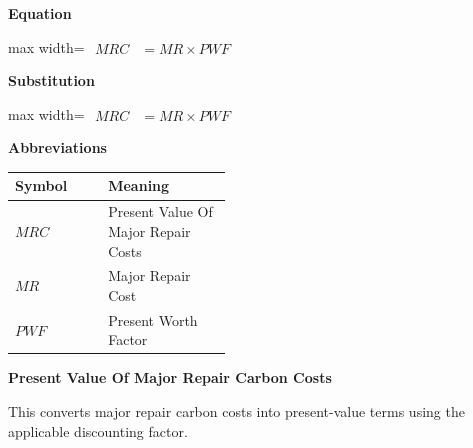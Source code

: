 \documentclass{article}
\begin{document}
\vspace{0.4em}
\textbf{Equation}\par\vspace{-0.35em}
\begin{center}
\begin{adjustbox}{max width=\linewidth}
$\displaystyle\begin{aligned}
MRC &= MR \times PWF
\end{aligned}$
\end{adjustbox}
\end{center}
\vspace{0.4em}
\textbf{Substitution}\par\vspace{-0.35em}
\begin{center}
\begin{adjustbox}{max width=\linewidth}
$\displaystyle\begin{aligned}
MRC &= MR \times PWF
\end{aligned}$
\end{adjustbox}
\end{center}
\vspace{0.4em}
\textbf{Abbreviations}\par\vspace{-0.35em}
\begin{tabularx}{\linewidth}{>{\raggedright\arraybackslash}p{0.43\linewidth} >{\raggedright\arraybackslash}X}
\toprule
Symbol & Meaning \\
\midrule
$MRC$ & Present Value Of Major Repair Costs \\
$MR$ & Major Repair Cost \\
$PWF$ & Present Worth Factor \\
\bottomrule
\end{tabularx}
\vspace{0.6em}
\vspace{0.4em}
\textbf{Present Value Of Major Repair Carbon Costs}\par\vspace{-0.35em}
This converts major repair carbon costs into present-value terms using the applicable discounting factor.
\end{document}
